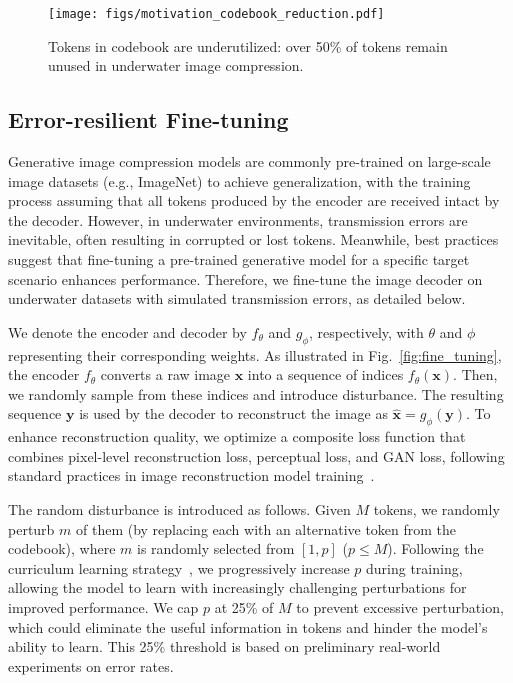 \begin{figure}[t]
    \centering
    \texttt{[image: figs/motivation\_codebook\_reduction.pdf]}
    \vspace{-5pt}
    \caption{Tokens in codebook are underutilized: over 50\% of tokens remain unused in underwater image compression.}
    \label{fig:codebook_merger}
\end{figure}





\subsection{Error-resilient Fine-tuning}\label{sec:fine_tuning}

Generative image compression models are commonly pre-trained on large-scale
image datasets (e.g., ImageNet) to achieve generalization, with the training
process assuming that all tokens produced by the encoder are received intact
by the decoder.
However, in underwater environments, transmission errors are inevitable,
often resulting in corrupted or lost tokens.
Meanwhile, best practices suggest that fine-tuning a pre-trained generative
model for a specific target scenario enhances performance.
Therefore, we fine-tune the image decoder on underwater
datasets with simulated transmission errors, as detailed below.

We denote the encoder and decoder by $f_{\theta}$ and $g_{\phi}$, respectively,
with $\theta$ and $\phi$ representing their corresponding weights.
As illustrated in Fig.~\ref{fig:fine_tuning}, the encoder $f_{\theta}$
converts a raw image $\mathbf{x}$ into a sequence of indices
$f_{\theta}(\mathbf{x})$.
Then, we randomly sample from these indices and introduce disturbance.
The resulting sequence $\mathbf{y}$ is used by the decoder to
reconstruct the image as $\hat{\mathbf{x}} = g_{\phi}(\mathbf{y})$.
To enhance reconstruction quality, we optimize a composite loss function that
combines pixel-level reconstruction loss, perceptual loss, and GAN loss,
following standard practices in image reconstruction model
training~\cite{esser2021taming}.


The random disturbance is introduced as follows.
Given $M$ tokens, we randomly perturb $m$ of them (by replacing each
with an alternative token from the codebook), where $m$ is randomly selected
from $[1, p]$ ($p \le M$).
Following the curriculum learning strategy~\cite{bengio2009curriculum}, we progressively increase $p$ during training, allowing the model to learn with increasingly challenging perturbations for improved performance. We cap \( p \) at 25\% of \( M \) to prevent excessive perturbation, which could eliminate the useful information in tokens and hinder the model's ability to learn. This 25\% threshold is based on preliminary real-world experiments on error rates.






